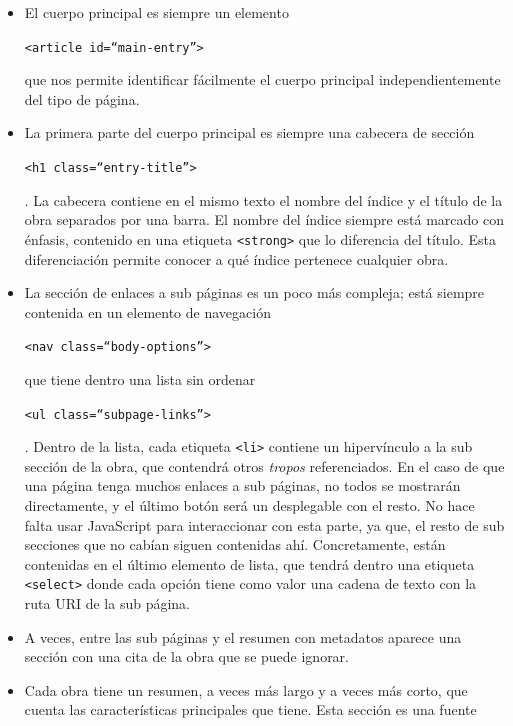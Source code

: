 \begin{itemize}
  \item El cuerpo principal es siempre un elemento
  \begin{otherlanguage}{english}\texttt{<article
  id=``main-entry''>}\end{otherlanguage} que nos permite identificar fácilmente
  el cuerpo principal independientemente del tipo de página.
  \item La primera parte del cuerpo principal es siempre una cabecera de sección
  \begin{otherlanguage}{english}\texttt{<h1
  class=``entry-title''>}\end{otherlanguage}. La cabecera contiene en el mismo
  texto el nombre del índice y el título de la obra separados por una barra. El
  nombre del índice siempre está marcado con énfasis, contenido en una etiqueta
  \texttt{<strong>} que lo diferencia del título. Esta diferenciación permite
  conocer a qué índice pertenece cualquier obra.
  \item La sección de enlaces a sub páginas es un poco más compleja; está
  siempre contenida en un elemento de navegación
  \begin{otherlanguage}{english}\texttt{<nav
  class=``body-options''>}\end{otherlanguage} que tiene dentro una lista sin
  ordenar \begin{otherlanguage}{english}\texttt{<ul
  class=``subpage-links''>}\end{otherlanguage}. Dentro de la lista, cada
  etiqueta \texttt{<li>} contiene un hipervínculo a la sub sección de la obra,
  que contendrá otros \textit{tropos} referenciados. En el caso de que una
  página tenga muchos enlaces a sub páginas, no todos se mostrarán directamente,
  y el último botón será un desplegable con el resto. No hace falta usar
  JavaScript para interaccionar con esta parte, ya que, el resto de sub
  secciones que no cabían siguen contenidas ahí. Concretamente, están contenidas
  en el último elemento de lista, que tendrá dentro una etiqueta
  \texttt{<select>} donde cada opción tiene como valor una cadena de texto con
  la ruta URI de la sub página.
  \item A veces, entre las sub páginas y el resumen con metadatos aparece una
  sección con una cita de la obra que se puede ignorar.
  \item Cada obra tiene un resumen, a veces más largo y a veces más corto, que
  cuenta las características principales que tiene. Esta sección es una fuente

\end{itemize}
